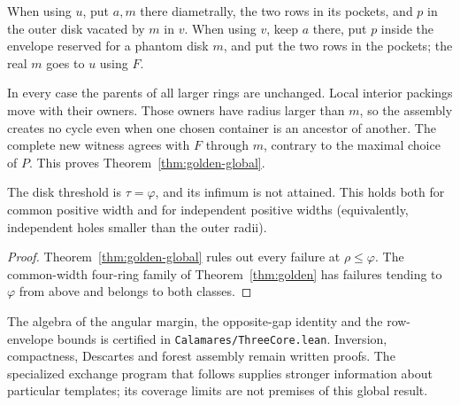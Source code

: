 When using $u$, put $a,m$ there diametrally, the two rows in its
pockets, and $p$ in the outer disk vacated by $m$ in $v$. When using
$v$, keep $a$ there, put $p$ inside the envelope reserved for a phantom
disk $m$, and put the two rows in the pockets; the real $m$ goes to
$u$ using $F$.

In every case the parents of all larger rings are unchanged. Local
interior packings move with their owners. Those owners have radius
larger than $m$, so the assembly creates no cycle even when one chosen
container is an ancestor of another. The complete new witness agrees
with $F$ through $m$, contrary to the maximal choice of $P$. This proves
Theorem~\ref{thm:golden-global}.


\begin{corollary}\label{cor:golden-global}
The disk threshold is $\tau=\varphi$, and its infimum is not attained.
This holds both for common positive width and for independent positive
widths (equivalently, independent holes smaller than the outer radii).
\end{corollary}
\begin{proof}
Theorem~\ref{thm:golden-global} rules out every failure at
$\rho\le\varphi$. The common-width four-ring family of
Theorem~\ref{thm:golden} has failures tending to $\varphi$ from above
and belongs to both classes.
\end{proof}
The algebra of the angular margin, the opposite-gap identity and the
row-envelope bounds is certified in \texttt{Calamares/ThreeCore.lean}.
Inversion, compactness, Descartes and forest assembly remain written
proofs. The specialized exchange program that follows supplies stronger
information about particular templates; its coverage limits are not
premises of this global result.

